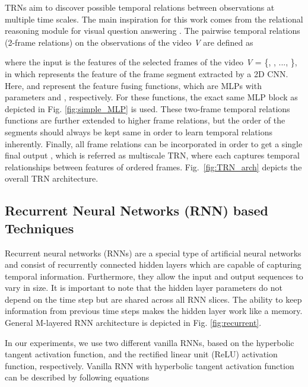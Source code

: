 \documentclass[runningheads]{llncs}
\begin{document}
TRNs \cite{Zhou2018-ah} aim to discover possible temporal relations between observations at multiple time scales. The main inspiration for this work comes from the relational reasoning module for visual question answering \cite{santoro2017simple}. The pairwise temporal relations (2-frame relations) on the observations of the video \textit{V} are defined as

\noindent where the input is the features of the  selected frames of the video \textit{V} = \{, , ..., \}, in which  represents the feature of the  frame segment extracted by a 2D CNN. Here,  and  represent the feature fusing functions, which are MLPs with parameters  and , respectively. For these functions, the exact same MLP block as depicted in Fig. \ref{fig:simple_MLP} is used. These two-frame temporal relations functions are further extended to higher frame relations, but the order of the segments should always be kept same in order to learn temporal relations inherently. Finally, all frame relations can be incorporated in order to get a single final output , which is referred as multiscale TRN, where each  captures temporal relationships between features of  ordered frames. Fig.~\ref{fig:TRN_arch} depicts the overall TRN architecture.








\subsection{Recurrent Neural Networks (RNN) based Techniques}
Recurrent neural networks (RNNs) are a special type of artificial neural networks and consist of recurrently connected hidden layers which are capable of capturing temporal information. Furthermore, they allow the input and output sequences to vary in size. It is important to note that the hidden layer parameters do not depend on the time step but are shared across all RNN slices. The ability to keep information from previous time steps makes the hidden layer work like a memory. General M-layered RNN architecture is depicted in Fig. \ref{fig:recurrent}.











In our experiments, we use two different vanilla RNNs, based on the hyperbolic tangent activation function, and the rectified linear unit (ReLU) activation function, respectively. Vanilla RNN with hyperbolic tangent activation function can be described by following equations
\end{document}
